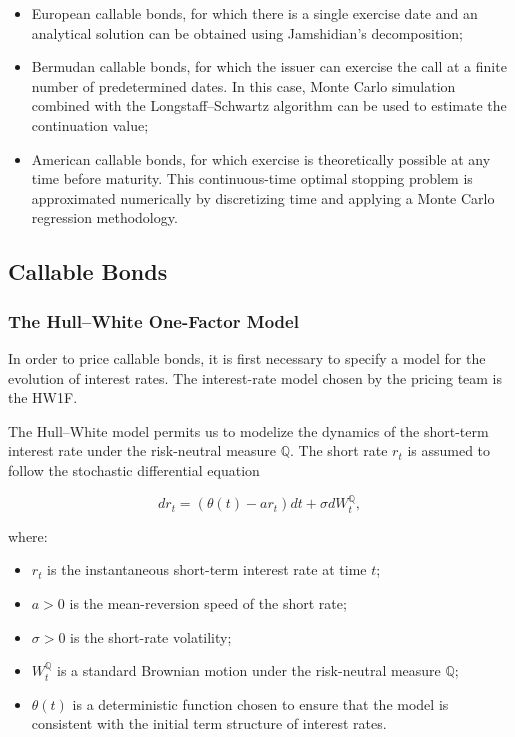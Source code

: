 \documentclass{article}
\begin{document}
\begin{itemize}
    \item European callable bonds, for which there is a single
    exercise date and an analytical solution can be obtained using
    Jamshidian's decomposition;
    
    \item Bermudan callable bonds, for which the issuer can exercise
    the call at a finite number of predetermined dates. In this case,
    Monte Carlo simulation combined with the Longstaff--Schwartz
    algorithm can be used to estimate the continuation value;
    
    \item American callable bonds, for which exercise is theoretically
    possible at any time before maturity. This continuous-time optimal
    stopping problem is approximated numerically by discretizing time
    and applying a Monte Carlo regression methodology.
\end{itemize}

\subsection{Callable Bonds}

\subsubsection{The Hull--White One-Factor Model}

In order to price callable bonds, it is first necessary to specify
a model for the evolution of interest rates. The interest-rate model
chosen by the pricing team is the HW1F.

The Hull--White model permits us to modelize the dynamics of the short-term interest rate under the risk-neutral measure $\mathbb{Q}$. The short rate $r_t$ is assumed to follow the stochastic differential equation

\begin{equation}
    dr_t =
    \left(
        \theta(t) - a r_t
    \right)dt
    + \sigma dW_t^{\mathbb{Q}},
\end{equation}

where:

\begin{itemize}
    \item $r_t$ is the instantaneous short-term interest rate at time
    $t$;
    
    \item $a>0$ is the mean-reversion speed of the short rate;
    
    \item $\sigma>0$ is the short-rate volatility;
    
    \item $W_t^{\mathbb{Q}}$ is a standard Brownian motion under the
    risk-neutral measure $\mathbb{Q}$;
    
    \item $\theta(t)$ is a deterministic function chosen to ensure
    that the model is consistent with the initial term structure of
    interest rates.
\end{itemize}
\end{document}
